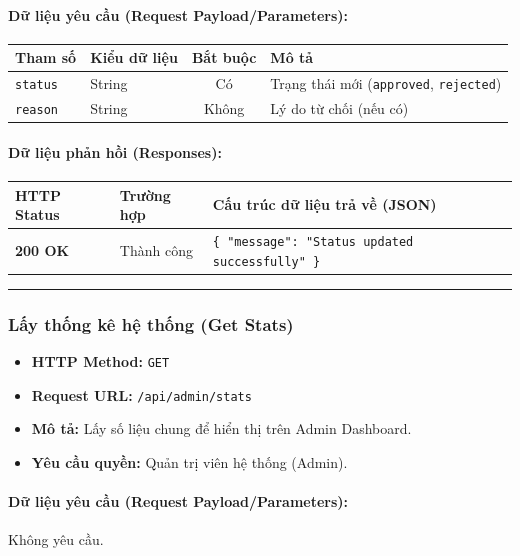 \documentclass[12pt,a4paper]{article}
\begin{document}
\paragraph{Dữ liệu yêu cầu (Request Payload/Parameters):}
\begin{longtable}{|>{\raggedright\arraybackslash}p{2.8cm}|>{\raggedright\arraybackslash}p{2.2cm}|c|>{\raggedright\arraybackslash}p{7.0cm}|}
\hline
\textbf{Tham số} & \textbf{Kiểu dữ liệu} & \textbf{Bắt buộc} & \textbf{Mô tả} \\ \hline
\endhead
\texttt{status} & String & Có & Trạng thái mới (\texttt{approved}, \texttt{rejected}) \\ \hline
\texttt{reason} & String & Không & Lý do từ chối (nếu có) \\ \hline
\end{longtable}

\paragraph{Dữ liệu phản hồi (Responses):}
\begin{longtable}{|>{\raggedright\arraybackslash}p{2.8cm}|>{\raggedright\arraybackslash}p{3.2cm}|>{\raggedright\arraybackslash}p{8.0cm}|}
\hline
\textbf{HTTP Status} & \textbf{Trường hợp} & \textbf{Cấu trúc dữ liệu trả về (JSON)} \\ \hline
\endhead
\textbf{200 OK} & Thành công & \texttt{\{ "message": "Status updated successfully" \}} \\ \hline
\end{longtable}

\vskip 0.4cm
\noindent\rule{\textwidth}{0.3pt}
\vskip 0.4cm

\subsubsection{Lấy thống kê hệ thống (Get Stats)}
\begin{itemize}[leftmargin=*]
    \item \textbf{HTTP Method:} \texttt{GET}
    \item \textbf{Request URL:} \texttt{/api/admin/stats}
    \item \textbf{Mô tả:} Lấy số liệu chung để hiển thị trên Admin Dashboard.
    \item \textbf{Yêu cầu quyền:} Quản trị viên hệ thống (Admin).
\end{itemize}

\paragraph{Dữ liệu yêu cầu (Request Payload/Parameters):}
Không yêu cầu.\\
\end{document}
